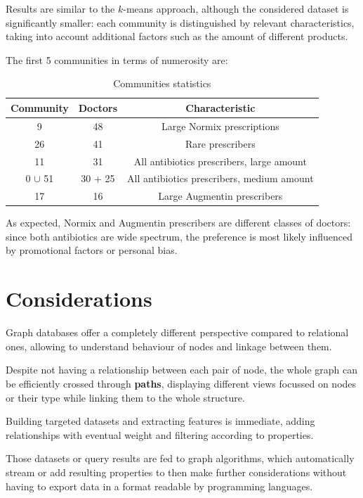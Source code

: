 Results are similar to the $k$-means approach, although the considered dataset is significantly smaller: each community is distinguished by relevant characteristics, taking into account additional factors such as the amount of different products.

The first 5 communities in terms of numerosity are:
\begin{table}[h]
	\centering
	\begin{tabular}{c|c|c}
		\textbf{Community} & \textbf{Doctors}  & \textbf{Characteristic} \\
		\hline
		9 & 48 & Large Normix prescriptions \\
		\hline
		26 & 41 & Rare prescribers \\
		\hline
		11 & 31 & All antibiotics prescribers, large amount \\
		\hline
		0 $\cup$ 51 & 30 + 25 & All antibiotics prescribers, medium amount \\
		\hline
		17 & 16 & Large Augmentin prescribers \\
		\hline
	\end{tabular}
\caption{\small Communities statistics}
\end{table}

As expected, Normix and Augmentin prescribers are different classes of doctors: since both antibiotics are wide spectrum, the preference is most likely influenced by promotional factors or personal bias.

\section{Considerations}
Graph databases offer a completely different perspective compared to relational ones, allowing to understand behaviour of nodes and linkage between them.

Despite not having a relationship between each pair of node, the whole graph can be efficiently crossed through \textbf{paths}, displaying different views focussed on nodes or their type while linking them to the whole structure. 

Building targeted datasets and extracting features is immediate, adding relationships with eventual weight and filtering according to properties.

Those datasets or query results are fed to graph algorithms, which automatically stream or add resulting properties to then make further considerations without having to export data in a format readable by programming languages.

